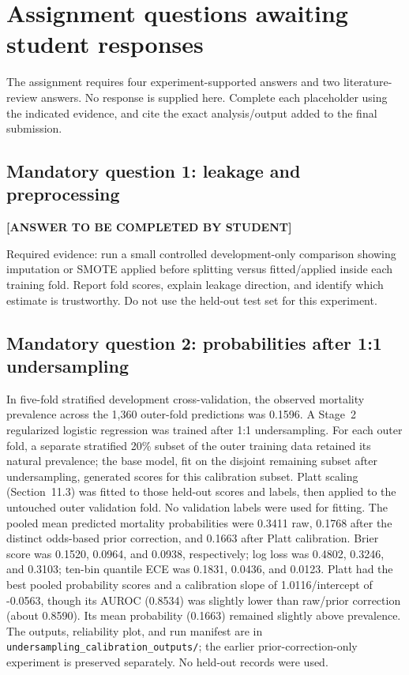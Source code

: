 \section{Assignment questions awaiting student responses}\label{sec:questions}
The assignment requires four experiment-supported answers and two literature-review answers. No response is supplied here. Complete each placeholder using the indicated evidence, and cite the exact analysis/output added to the final submission.

\subsection{Mandatory question 1: leakage and preprocessing}
\textbf{[ANSWER TO BE COMPLETED BY STUDENT]}\par
Required evidence: run a small controlled development-only comparison showing imputation or SMOTE applied before splitting versus fitted/applied inside each training fold. Report fold scores, explain leakage direction, and identify which estimate is trustworthy. Do not use the held-out test set for this experiment.

\subsection{Mandatory question 2: probabilities after 1:1 undersampling}
In five-fold stratified development cross-validation, the observed mortality prevalence across the 1,360 outer-fold predictions was 0.1596. A Stage~2 regularized logistic regression was trained after 1:1 undersampling. For each outer fold, a separate stratified 20\% subset of the outer training data retained its natural prevalence; the base model, fit on the disjoint remaining subset after undersampling, generated scores for this calibration subset. Platt scaling (Section~11.3) was fitted to those held-out scores and labels, then applied to the untouched outer validation fold. No validation labels were used for fitting. The pooled mean predicted mortality probabilities were 0.3411 raw, 0.1768 after the distinct odds-based prior correction, and 0.1663 after Platt calibration. Brier score was 0.1520, 0.0964, and 0.0938, respectively; log loss was 0.4802, 0.3246, and 0.3103; ten-bin quantile ECE was 0.1831, 0.0436, and 0.0123. Platt had the best pooled probability scores and a calibration slope of 1.0116/intercept of -0.0563, though its AUROC (0.8534) was slightly lower than raw/prior correction (about 0.8590). Its mean probability (0.1663) remained slightly above prevalence. The outputs, reliability plot, and run manifest are in \texttt{undersampling\_calibration\_outputs/}; the earlier prior-correction-only experiment is preserved separately. No held-out records were used.

